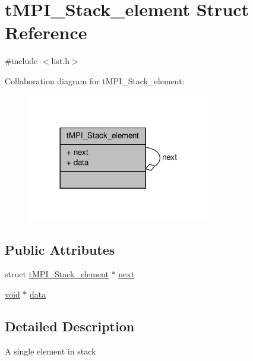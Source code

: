 \hypertarget{structtMPI__Stack__element}{\section{t\-M\-P\-I\-\_\-\-Stack\-\_\-element \-Struct \-Reference}
\label{structtMPI__Stack__element}
}


{\ttfamily \#include $<$list.\-h$>$}



\-Collaboration diagram for t\-M\-P\-I\-\_\-\-Stack\-\_\-element\-:
\nopagebreak
\begin{figure}[H]
\begin{center}
\leavevmode
\includegraphics[width=228pt]{structtMPI__Stack__element__coll__graph}
\end{center}
\end{figure}
\subsection*{\-Public \-Attributes}
\begin{DoxyCompactItemize}
\item 
struct \hyperlink{structtMPI__Stack__element}{t\-M\-P\-I\-\_\-\-Stack\-\_\-element} $\ast$ \hyperlink{structtMPI__Stack__element_a1b090224fc36ec976f7e99ee2ff35de6}{next}
\item 
\hyperlink{nbnxn__kernel__simd__4xn__outer_8h_a8dc3f4a797ed992dff49d2fa3477eee8}{void} $\ast$ \hyperlink{structtMPI__Stack__element_a2922b567443e26c64eee23169c8acb0e}{data}
\end{DoxyCompactItemize}


\subsection{\-Detailed \-Description}
\-A single element in stack 

